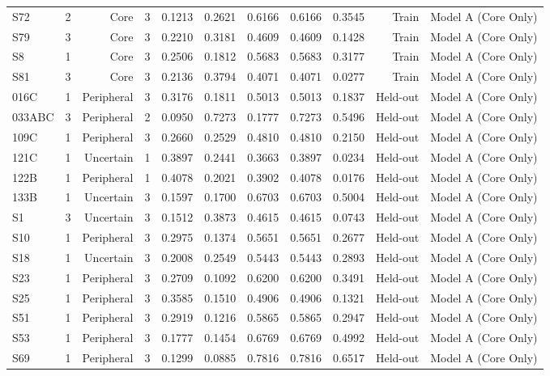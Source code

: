 {\begin{longtable}{lrrrrrrrrrr}
  S72 & 2 & Core & 3 & 0.1213 & 0.2621 & 0.6166 & 0.6166 & 0.3545 & Train & Model A (Core Only) \\
  S79 & 3 & Core & 3 & 0.2210 & 0.3181 & 0.4609 & 0.4609 & 0.1428 & Train & Model A (Core Only) \\
  S8 & 1 & Core & 3 & 0.2506 & 0.1812 & 0.5683 & 0.5683 & 0.3177 & Train & Model A (Core Only) \\
  S81 & 3 & Core & 3 & 0.2136 & 0.3794 & 0.4071 & 0.4071 & 0.0277 & Train & Model A (Core Only) \\
  016C & 1 & Peripheral & 3 & 0.3176 & 0.1811 & 0.5013 & 0.5013 & 0.1837 & Held-out & Model A (Core Only) \\
  033ABC & 3 & Peripheral & 2 & 0.0950 & 0.7273 & 0.1777 & 0.7273 & 0.5496 & Held-out & Model A (Core Only) \\
  109C & 1 & Peripheral & 3 & 0.2660 & 0.2529 & 0.4810 & 0.4810 & 0.2150 & Held-out & Model A (Core Only) \\
  121C & 1 & Uncertain & 1 & 0.3897 & 0.2441 & 0.3663 & 0.3897 & 0.0234 & Held-out & Model A (Core Only) \\
  122B & 1 & Peripheral & 1 & 0.4078 & 0.2021 & 0.3902 & 0.4078 & 0.0176 & Held-out & Model A (Core Only) \\
  133B & 1 & Uncertain & 3 & 0.1597 & 0.1700 & 0.6703 & 0.6703 & 0.5004 & Held-out & Model A (Core Only) \\
  S1 & 3 & Uncertain & 3 & 0.1512 & 0.3873 & 0.4615 & 0.4615 & 0.0743 & Held-out & Model A (Core Only) \\
  S10 & 1 & Peripheral & 3 & 0.2975 & 0.1374 & 0.5651 & 0.5651 & 0.2677 & Held-out & Model A (Core Only) \\
  S18 & 1 & Uncertain & 3 & 0.2008 & 0.2549 & 0.5443 & 0.5443 & 0.2893 & Held-out & Model A (Core Only) \\
  S23 & 1 & Peripheral & 3 & 0.2709 & 0.1092 & 0.6200 & 0.6200 & 0.3491 & Held-out & Model A (Core Only) \\
  S25 & 1 & Peripheral & 3 & 0.3585 & 0.1510 & 0.4906 & 0.4906 & 0.1321 & Held-out & Model A (Core Only) \\
  S51 & 1 & Peripheral & 3 & 0.2919 & 0.1216 & 0.5865 & 0.5865 & 0.2947 & Held-out & Model A (Core Only) \\
  S53 & 1 & Peripheral & 3 & 0.1777 & 0.1454 & 0.6769 & 0.6769 & 0.4992 & Held-out & Model A (Core Only) \\
  S69 & 1 & Peripheral & 3 & 0.1299 & 0.0885 & 0.7816 & 0.7816 & 0.6517 & Held-out & Model A (Core Only) \\

\end{longtable}}
